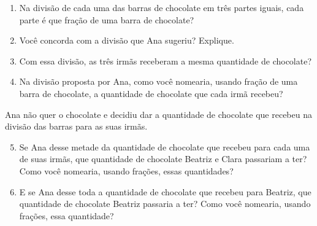 \begin{atividade}{}
\begin{center}
\end{center}

\begin{enumerate} %
  \item Na divisão de cada uma das barras de chocolate em três partes iguais, ca\-da parte é que fração de uma barra de chocolate?
  \item Você concorda com a divisão que Ana sugeriu? Explique.
  \item Com essa divisão, as três irmãs receberam a mesma quantidade de chocolate?
  \item Na divisão proposta por Ana, como você nomearia, usando fração de uma barra de chocolate, a quantidade de chocolate que cada irmã recebeu?
\end{enumerate}

Ana não quer o chocolate e decidiu dar a quantidade de chocolate que recebeu na divisão das barras para as suas irmãs.

\begin{enumerate}\setcounter{enumi}{4}
\item Se Ana desse metade da quantidade de chocolate que recebeu para cada uma de suas irmãs, que quantidade de chocolate Beatriz e Clara passariam a ter? Como você nomearia, usando frações, essas quantidades?
\item E se Ana desse toda a quantidade de chocolate que recebeu para Beatriz, que quantidade de chocolate  Beatriz passaria a ter? Como você nomearia, usando frações, essa quantidade?
\end{enumerate} %
\end{atividade}

